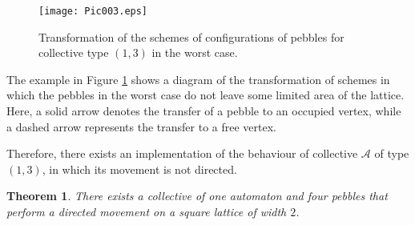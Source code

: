 \documentclass{article}
\newtheorem{theorem}{Theorem}
\newenvironment{proof}[1][Proof]{\begin{trivlist}
\item[\hskip \labelsep {\bfseries #1}]}{\end{trivlist}}
\newcommand{\qed}{\nobreak \ifvmode \relax \else
      \ifdim\lastskip<1.5em \hskip-\lastskip
      \hskip1.5em plus0em minus0.5em \fi \nobreak
      \vrule height0.75em width0.5em depth0.25em\fi}
\begin{document}
\begin{proof}
\begin{figure}[h]
	\centering
	\texttt{[image: Pic003.eps]}
	\caption{Transformation of the schemes of configurations of pebbles for collective type $(1, 3)$ in the worst case.}
	\label{fig:fig3}
\end{figure}

The example in Figure \ref{fig:fig3} shows a diagram of the transformation of schemes in which the pebbles in the worst case do not leave some limited area of the lattice. 
Here, a solid arrow denotes the transfer of a pebble to an occupied vertex, while a dashed arrow represents the transfer to a free vertex.

Therefore, there exists an implementation of the behaviour of collective $\mathcal{A}$ of type $(1, 3)$, in which its movement is not directed.
\qed
\end{proof}

\begin{theorem}
There exists a collective of one automaton and four pebbles that perform a directed movement on a square lattice of width $2$.
\end{theorem}
\end{document}
